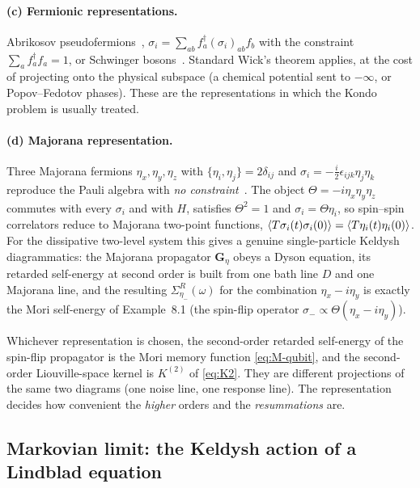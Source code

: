 \paragraph{(c) Fermionic representations.}
Abrikosov pseudofermions~\cite{Abrikosov1965}, $\sigma_i=\sum_{ab}f_a^\dagger(\sigma_i)_{ab}f_b$ with the constraint $\sum_af^\dagger_af_a=1$, or Schwinger bosons~\cite{Schwinger1965}.
Standard Wick's theorem applies, at the cost of projecting onto the physical subspace (a chemical potential sent to $-\infty$, or Popov--Fedotov phases).
These are the representations in which the Kondo problem is usually treated.

\paragraph{(d) Majorana representation.}
Three Majorana fermions $\eta_x,\eta_y,\eta_z$ with $\{\eta_i,\eta_j\}=2\delta_{ij}$ and $\sigma_i=-\tfrac i2\epsilon_{ijk}\eta_j\eta_k$ reproduce the Pauli algebra with \emph{no constraint}~\cite{ShnirmanMakhlin2003}.
The object $\Theta=-i\eta_x\eta_y\eta_z$ commutes with every $\sigma_i$ and with $H$, satisfies $\Theta^2=1$ and $\sigma_i=\Theta\eta_i$, so spin--spin correlators reduce to Majorana two-point functions, $\langle T\sigma_i(t)\sigma_i(0)\rangle=\langle T\eta_i(t)\eta_i(0)\rangle$.
For the dissipative two-level system this gives a genuine single-particle Keldysh diagrammatics: the Majorana propagator $\mathbf G_{\eta}$ obeys a Dyson equation, its retarded self-energy at second order is built from one bath line $D$ and one Majorana line, and the resulting $\Sigma^R_{\eta_-}(\omega)$ for the combination $\eta_x-i\eta_y$ is exactly the Mori self-energy of Example~8.1 (the spin-flip operator $\sigma_-\propto\Theta(\eta_x-i\eta_y)$).

\begin{keybox}
Whichever representation is chosen, the second-order retarded self-energy of the spin-flip propagator is the Mori memory function \eqref{eq:M-qubit}, and the second-order Liouville-space kernel is $K^{(2)}$ of \cref{eq:K2}.
They are different projections of the same two diagrams (one noise line, one response line).
The representation decides how convenient the \emph{higher} orders and the \emph{resummations} are.
\end{keybox}

\subsection{Markovian limit: the Keldysh action of a Lindblad equation}

